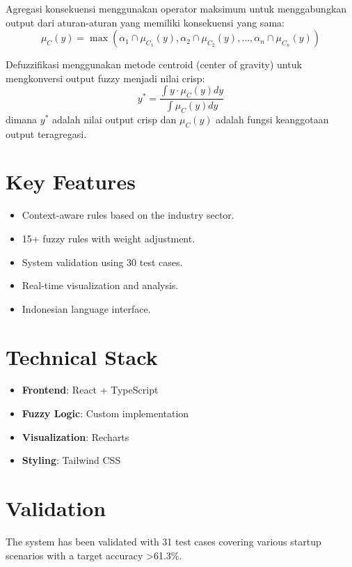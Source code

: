 \documentclass{article}
\begin{document}
Agregasi konsekuensi menggunakan operator maksimum untuk menggabungkan output dari aturan-aturan yang memiliki konsekuensi yang sama:
\begin{equation}
\mu_C(y) = \max(\alpha_1 \cap \mu_{C_1}(y), \alpha_2 \cap \mu_{C_2}(y), \dots, \alpha_n \cap \mu_{C_n}(y))
\end{equation}

Defuzzifikasi menggunakan metode centroid (center of gravity) untuk mengkonversi output fuzzy menjadi nilai crisp:
\begin{equation}
y^* = \frac{\int y \cdot \mu_C(y) dy}{\int \mu_C(y) dy}
\end{equation}
dimana $y^*$ adalah nilai output crisp dan $\mu_C(y)$ adalah fungsi keanggotaan output teragregasi.

\section{Key Features}
\begin{itemize}
    \item Context-aware rules based on the industry sector.
    \item 15+ fuzzy rules with weight adjustment.
    \item System validation using 30 test cases.
    \item Real-time visualization and analysis.
    \item Indonesian language interface.
\end{itemize}

\section{Technical Stack}
\begin{itemize}
    \item \textbf{Frontend}: React + TypeScript
    \item \textbf{Fuzzy Logic}: Custom implementation
    \item \textbf{Visualization}: Recharts
    \item \textbf{Styling}: Tailwind CSS
\end{itemize}

\section{Validation}
The system has been validated with 31 test cases covering various startup scenarios with a target accuracy >61.3\%.
\end{document}
